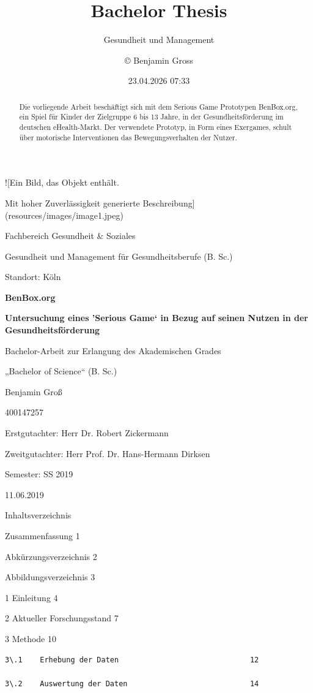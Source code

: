 \documentclass[
  a4paper,
  DIV=11,
  numbers=noendperiod,
  onecolumn,
  oneside,
  a4paper]{scrartcl}
\title{Bachelor Thesis}
\subtitle{Gesundheit und Management}
\author{© Benjamin Gross}
\date{23.04.2026 07:33}
\renewcommand*\contentsname{Table of contents}
\newcommand\contentsname{Table of contents}
\begin{document}
\maketitle
\begin{abstract}
Die vorliegende Arbeit beschäftigt sich mit dem Serious Game Prototypen
BenBox.org, ein Spiel für Kinder der Zielgruppe 6 bis 13 Jahre, in der
Gesundheitsförderung im deutschen eHealth-Markt. Der verwendete
Prototyp, in Form eines Exergames, schult über motorische Interventionen
das Bewegungsverhalten der Nutzer.
\end{abstract}

\renewcommand*\contentsname{Table of contents}
{
\hypersetup{linkcolor=}
\setcounter{tocdepth}{5}
\tableofcontents
}

!{[}Ein Bild, das Objekt enthält.

Mit hoher Zuverlässigkeit generierte
Beschreibung{]}(resources/images/image1.jpeg)

Fachbereich Gesundheit \& Soziales

Gesundheit und Management für Gesundheitsberufe (B. Sc.)

Standort: Köln

\textbf{BenBox.org }

\textbf{Untersuchung eines 'Serious Game` in Bezug auf seinen Nutzen in
der Gesundheitsförderung}

Bachelor-Arbeit zur Erlangung des Akademischen Grades

„Bachelor of Science`` (B. Sc.)

Benjamin Groß

400147257

Erstgutachter: Herr Dr. Robert Zickermann

Zweitgutachter: Herr Prof. Dr. Hans-Hermann Dirksen

Semester: SS 2019

11.06.2019

Inhaltsverzeichnis

Zusammenfassung 1

Abkürzungsverzeichnis 2

Abbildungsverzeichnis 3

1 Einleitung 4

2 Aktueller Forschungsstand 7

3 Methode 10

\begin{verbatim}
3\.1    Erhebung der Daten                              12

3\.2    Auswertung der Daten                            14
\end{verbatim}
\end{document}
